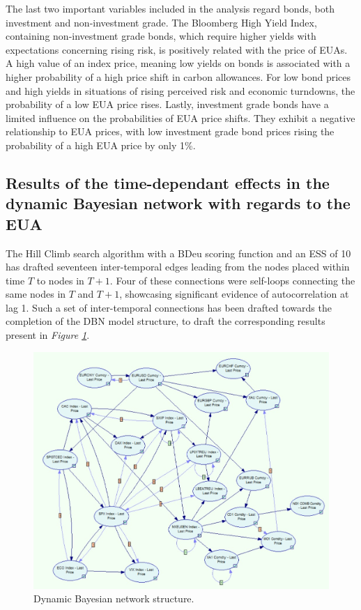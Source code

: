 \documentclass[12pt, letterpaper]{article}
\begin{document}
The last two important variables included in the analysis regard bonds, both investment and non-investment grade.  The Bloomberg High Yield Index, containing non-investment grade bonds, which require higher yields with expectations concerning rising risk, is positively related with the price of EUAs. A high value of an index price, meaning low yields on bonds is associated with a higher probability of a high price shift in carbon allowances. For low bond prices and high yields in situations of rising perceived risk and economic turndowns, the probability of a low EUA price rises. Lastly, investment grade bonds have a limited influence on the probabilities of EUA price shifts. They exhibit a negative relationship to EUA prices, with low investment grade bond prices rising the probability of a high EUA price by only 1\%.

\subsection{Results of the time-dependant effects in the dynamic Bayesian network with regards to the EUA}

The Hill Climb search algorithm with a BDeu scoring function and an ESS of 10 has drafted seventeen inter-temporal edges leading from the nodes placed within time $T$ to nodes in $T+1$. Four of these connections were self-loops connecting the same nodes in $T$ and $T+1$, showcasing significant evidence of autocorrelation at lag 1. Such a set of inter-temporal connections has been drafted towards the completion of the DBN model structure, to draft the corresponding results present in \textit{Figure \ref{fig:dbn}}.

\begin{figure}[ht]
\centering
\includegraphics[width=1\textwidth]{graphics/DBN.jpeg}
\caption{Dynamic Bayesian network structure.}
\label{fig:dbn}
\end{figure}
\end{document}
